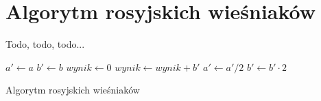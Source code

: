 \section{Algorytm rosyjskich wieśniaków}

Todo, todo, todo...

\begin{algorithm}[h]
  \DontPrintSemicolon
  
  
  
  $a' \leftarrow a$\;
  $b' \leftarrow b$\;
  $wynik \leftarrow 0$\;
  {
    {
      $wynik \leftarrow wynik + b'$\;
    }
    $a' \leftarrow a' / 2$\;
    $b' \leftarrow b' \cdot 2$\;
  }
  
  \caption{Algorytm rosyjskich wieśniaków}
  \label{alg-wiesniakow}
\end{algorithm}
